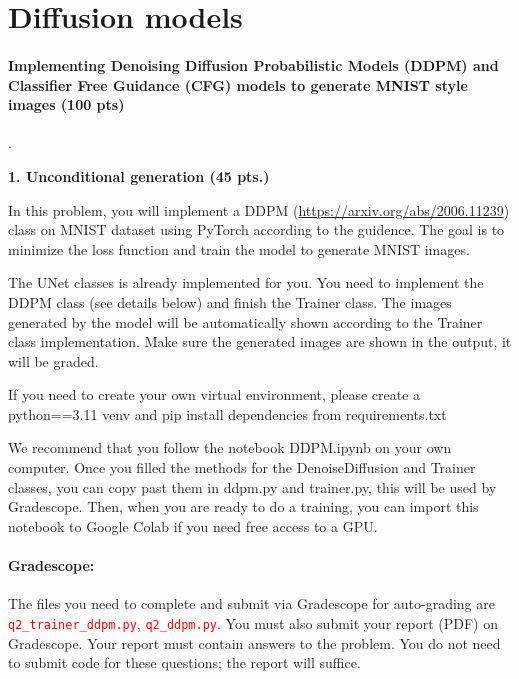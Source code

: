 \documentclass[12pt]{article}
\theoremstyle{definition}
\begin{document}
\section{Diffusion models}
\paragraph{Implementing Denoising Diffusion Probabilistic Models (DDPM) and Classifier Free Guidance (CFG) models to generate MNIST style images (100 pts)}. \\
\vspace{-0.5cm}
  
\textbf{1. Unconditional generation (45 pts.)}

In this problem, you will implement a DDPM (\url{https://arxiv.org/abs/2006.11239}) class on MNIST dataset using PyTorch according to the guidence. The goal is to minimize the loss function and train the model to generate MNIST images.

The UNet classes is already implemented for you. You need to implement the DDPM class (see details below) and finish the Trainer class. The images generated by the model will be automatically shown according to the Trainer class implementation. Make sure the generated images are shown in the output, it will be graded.

If you need to create your own virtual environment, please create a python==3.11 venv and pip install dependencies from requirements.txt 

We recommend that you follow the notebook DDPM.ipynb  on your own computer. Once you filled the methods for the DenoiseDiffusion and Trainer classes, you can copy past them in ddpm.py and trainer.py, this will be used by Gradescope. Then, when you are ready to do a training, you can import this notebook to Google Colab if you need free access to a GPU.

\paragraph{Gradescope:}

The files you need to complete and submit via Gradescope for auto-grading are \textcolor{red}{\texttt{q2\_trainer\_ddpm.py}}, \textcolor{red}{\texttt{q2\_ddpm.py}}.
You must also submit your report (PDF) on Gradescope. Your report must contain answers to the problem. You do not need to submit code for these questions; the report will suffice.\\\\
\end{document}

